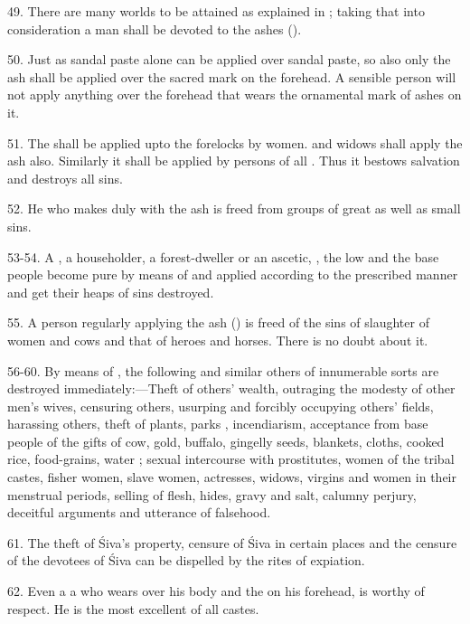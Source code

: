 49. There are many worlds to be attained as explained in ; taking that into consideration a man shall be devoted to the ashes
().

50. Just as sandal paste alone can be applied over sandal paste, so also only
the ash shall be applied over the sacred mark on the forehead. A sensible person
will not apply anything over the forehead that wears the ornamental mark of
ashes on it.

51. The  shall be applied upto the forelocks by women. 
and widows shall apply the ash also. Similarly it shall be applied by persons of
all . Thus it bestows salvation and destroys all sins.

52. He who makes  duly with the ash is freed from groups of great
as well as small sins.

53-54. A , a householder, a forest-dweller or an ascetic,
, the low and the base people become
pure by means of  and  applied according to
the prescribed manner and get their heaps of sins destroyed.

55. A person regularly applying the ash () is freed of the sins of
slaughter of women and cows and that of heroes and horses. There is no doubt
about it.

56-60. By means of , the following and similar others of
innumerable sorts are destroyed immediately:—Theft of others’ wealth, outraging
the modesty of other men’s wives, censuring others, usurping and forcibly
occupying others’ fields, harassing others, theft of plants, parks \etc,
incendiarism, acceptance from base people of the gifts of cow, gold, buffalo,
gingelly seeds, blankets, cloths, cooked rice, food-grains, water \etc; sexual
intercourse with prostitutes, women of the tribal castes, fisher women, slave
women, actresses, widows, virgins and women in their menstrual periods, selling
of flesh, hides, gravy \etc and salt, calumny perjury, deceitful arguments and
utterance of falsehood.

61. The theft of Śiva’s property, censure of Śiva in certain places and
the censure of the devotees of Śiva can be dispelled by the rites of expiation.

62. Even a a who wears  over his body and
the  on his forehead, is worthy of respect. He is the most
excellent of all castes.

